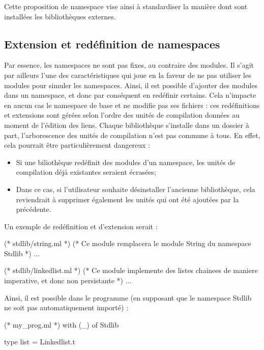 \documentclass[11pt,a4paper]{report}
\begin{document}
Cette proposition de namespace vise ainsi à standardiser la manière dont sont
installées les bibliothèques externes.

\subsection{Extension et redéfinition de namespaces}

Par essence, les namespaces ne sont pas fixes, au contraire des modules. Il
s'agit par ailleurs l'une des caractéristiques qui joue en la faveur de ne pas
utiliser les modules pour simuler les namespaces. Ainsi, il est possible
d'ajouter des modules dans un namespace, et donc par conséquent en redéfinir
certains. Cela n'impacte en aucun cas le namespace de base et ne modifie pas ses
fichiers : ces redéfinitions et extensions sont gérées selon l'ordre des unités
de compilation données au moment de l'édition des liens. Chaque bibliothèque
s'installe dans un dossier à part, l'arborescence des unités de compilation
n'est pas commune à tous. En effet, cela pourrait être particulièrement
dangereux :
\begin{itemize}
\item Si une biliothèque redéfinit des modules d'un namespace, les unités de
  compilation déjà existantes seraient écrasées;
\item Dans ce cas, si l'utilisateur souhaite désinstaller l'ancienne
  bibliothèque, cela reviendrait à supprimer également les unités qui ont été
  ajoutées par la précédente.
\end{itemize}

Un exemple de redéfinition et d'extension serait :
\begin{OCaml}
(* stdlib/string.ml *)
(* Ce module remplacera le module String du namespace Stdlib *)
...
\end{OCaml}

\begin{OCaml}
(* stdlib/linkedlist.ml *)
(* Ce module implemente des listes chainees de maniere imperative, et donc non
   persistante *)
...
\end{OCaml}

Ainsi, il est possible dans le programme (en supposant que le namespace Stdlib
ne soit pas automatiquement importé) :

\begin{OCaml}
(* my_prog.ml *)
with (_) of Stdlib

type list = Linkedlist.t
\end{OCaml}
\end{document}
